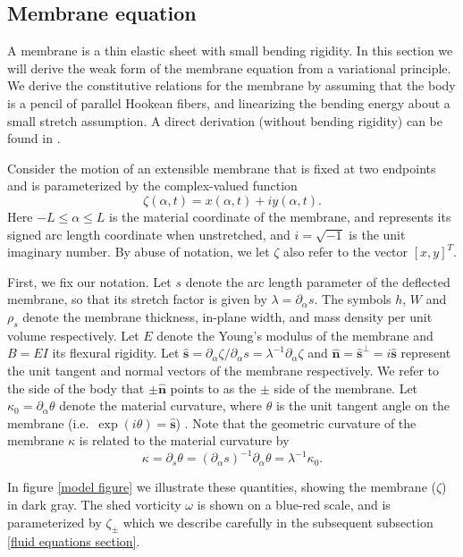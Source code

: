 \documentclass{article}[12pt]
\theoremstyle{Theorem}
\begin{document}
\subsection{Membrane equation}
\label{membrane section}
A membrane is a thin elastic sheet with small bending rigidity. In this section we will derive the weak form of the membrane equation from a variational principle. We derive the constitutive relations for the membrane by assuming that the body is a pencil of parallel Hookean fibers, and linearizing the bending energy about a small stretch assumption. A direct derivation (without bending rigidity) can be found in \cite{mavroyiakoumou2020large}.
\newline

Consider the motion of an extensible membrane that is fixed at two endpoints and is parameterized by the complex-valued function $$\zeta(\alpha, t) = x(\alpha, t) + i y(\alpha, t).$$
Here $-L\leq\alpha \leq L$ is the material coordinate of the membrane, and represents its signed arc length coordinate when unstretched, and $i = \sqrt{-1}$ is the unit imaginary number. By abuse of notation, we let $\zeta$ also refer to the vector $[x,y]^T$.
\newline

First, we fix our notation. Let $s$ denote the arc length parameter of the deflected membrane, so that its stretch factor is given by $\lambda = \partial_\alpha s$. The symbols $h$, $W$ and $\rho_s$ denote the membrane thickness, in-plane width, and mass density per unit volume respectively. Let $E$ denote the Young's modulus of the membrane and $B=EI$ its flexural rigidity. Let $\hat{\boldsymbol{s}} = \partial_{\alpha}\zeta/\partial_{\alpha}s=\lambda^{-1}\partial_\alpha\zeta$ and $\hat{\boldsymbol{n}} = \hat{\boldsymbol{s}}^\perp = i\hat{\boldsymbol{s}}$ represent the unit tangent and normal vectors of the membrane respectively. We refer to the side of the body that $\pm\hat{\boldsymbol{n}}$ points to as the $\pm$ side of the membrane. Let $\kappa_0 = \partial_\alpha\theta$ denote the material curvature, where $\theta$ is the unit tangent angle on the membrane (i.e.~$\exp(i\theta) = \hat{\boldsymbol{s}}$) \cite{gerstmayr2008correct}. Note that the geometric curvature of the membrane $\kappa$ is related to the material curvature by
$$\kappa = \partial_s\theta = (\partial_\alpha s)^{-1} \partial_\alpha\theta = \lambda^{-1}\kappa_0.$$ 

In figure \ref{model figure} we illustrate these quantities, showing the membrane ($\zeta$) in dark gray. The shed vorticity $\omega$ is shown on a blue-red scale, and is parameterized by $\zeta_{\pm}$ which we describe carefully in the subsequent subsection \ref{fluid equations section}.
\end{document}
